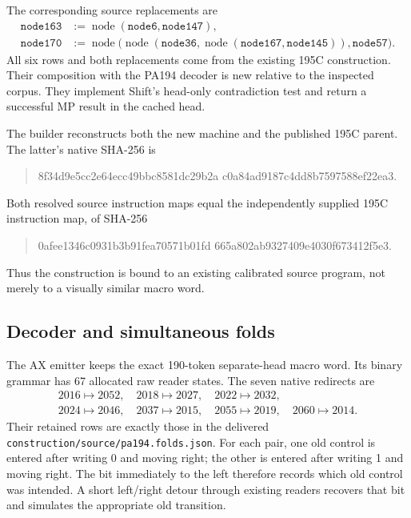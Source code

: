 \documentclass[11pt]{article}
\newcommand{\file}[1]{{\small\nolinkurl{#1}}}
\begin{document}


The corresponding source replacements are
\begin{align*}
\texttt{node163}&:=\operatorname{node}(\texttt{node6},\texttt{node147}),\\
\texttt{node170}&:=\operatorname{node}\bigl(
 \operatorname{node}(\texttt{node36},
   \operatorname{node}(\texttt{node167},\texttt{node145})),
 \texttt{node57}\bigr).
\end{align*}
All six rows and both replacements come from the existing 195C
construction. Their composition with the PA194 decoder is new relative
to the inspected corpus. They implement Shift's head-only contradiction
test and return a successful MP result in the cached head.

The builder reconstructs both the new machine and the published 195C
parent. The latter's native SHA-256 is
\begin{quote}\small\ttfamily
8f34d9e5cc2e64ecc49bbc8581dc29b2a\allowbreak
c0a84ad9187c4dd8b7597588ef22ea3.
\end{quote}
Both resolved source instruction maps equal the independently supplied
195C instruction map, of SHA-256
\begin{quote}\small\ttfamily
0afee1346c0931b3b91fea70571b01fd\allowbreak
665a802ab9327409e4030f673412f5e3.
\end{quote}
Thus the construction is bound to an existing calibrated source program,
not merely to a visually similar macro word.

\subsection{Decoder and simultaneous folds}

The AX emitter keeps the exact 190-token separate-head macro word. Its
binary grammar has 67 allocated raw reader states. The seven native
redirects are
\[
\begin{gathered}
2016\mapsto2052,\quad2018\mapsto2027,\quad2022\mapsto2032,\\
2024\mapsto2046,\quad2037\mapsto2015,\quad2055\mapsto2019,
\quad2060\mapsto2014.
\end{gathered}
\]
Their retained rows are exactly those in the delivered
\file{construction/source/pa194.folds.json}.
For each pair, one old control is entered after writing 0 and moving
right; the other is entered after writing 1 and moving right. The bit
immediately to the left therefore records which old control was intended.
A short left/right detour through existing readers recovers that bit and
simulates the appropriate old transition.
\end{document}
